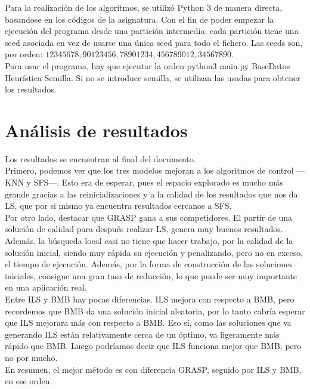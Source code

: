Para la realización de los algoritmos, se utilizó Python 3 de manera directa, basandose en los códigos de la asignatura. Con el fin de poder empezar la ejecución del programa desde una partición intermedia, cada partición tiene una seed asociada en vez de usarse una única seed para todo el fichero. Las seeds son, por orden: $12345678,90123456,78901234,456789012,34567890$. \\

Para usar el programa, hay que ejecutar la orden  python3 main.py BaseDatos Heurística Semilla. Si no se introduce semilla, se utilizan las usadas para obtener los resultados.
\newpage
\section{Análisis de resultados}

Los resultados se encuentran al final del documento.\\

Primero, podemos ver que los tres modelos mejoran a los algoritmos de control ---KNN y SFS---. Esto era de esperar, pues el espacio explorado es mucho más grande gracias a las reinicializaciones y a la calidad de los resultados que nos da LS, que por si mismo ya encuentra resultados cercanos a SFS.\\

Por otro lado, destacar que GRASP gana a sus competidores. El partir de una solución de calidad para después realizar LS, genera muy buenos resultados. Además, la búsqueda local casi no tiene que hacer trabajo, por la calidad de la solución inicial, siendo muy rápida su ejecución y penalizando, pero no en exceso, el tiempo de ejecución. Además, por la forma de construcción de las soluciones iniciales, consigue una gran tasa de reducción, lo que puede ser muy importante en una aplicación real.\\

Entre ILS y BMB hay pocas diferencias. ILS mejora con respecto a BMB, pero recordemos que BMB da una solución inicial aleatoria, por lo tanto cabría esperar que ILS mejorara más con respecto a BMB. Eso sí, como las soluciones que va generando ILS están relativamente cerca de un óptimo, va ligeramente más rápido que BMB. Luego podríamos decir que ILS funciona mejor que BMB, pero no por mucho.\\

En resumen, el mejor método es con diferencia GRASP, seguido por ILS y BMB, en ese orden.\\

